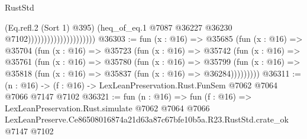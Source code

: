 \begin{lexlean}{RustStd}
\begin{coremodule}
                                            (Eq.refl.{2} (Sort 1) @395)
                                            (heq_of_eq.{1}
                                              @7087
                                              @36227
                                              @36230
                                              @7102)))))))))))))))))))))
@36303 := fun (x : @16) =>
  @35685
    (fun (x : @16) =>
    @35704
      (fun (x : @16) =>
      @35723
        (fun (x : @16) =>
        @35742
          (fun (x : @16) =>
          @35761
            (fun (x : @16) =>
            @35780
              (fun (x : @16) =>
              @35799
                (fun (x : @16) => @35818 (fun (x : @16) => @35837 (fun (x : @16) => @36284)))))))))
@36311 := (n : @16) -> (f : @16) -> LexLeanPreservation.Rust.FunSem @7062 @7064 @7066 @7147 @7102
@36321 := fun (n : @16) =>
  fun (f : @16) =>
  LexLeanPreservation.Rust.simulate
    @7062
    @7064
    @7066
    LexLeanPreserve.Ce86508016874a21d63a87c67bfe10b5a.R23.RustStd.crate_ok
    @7147
    @7102
\end{coremodule}
\end{lexlean}
